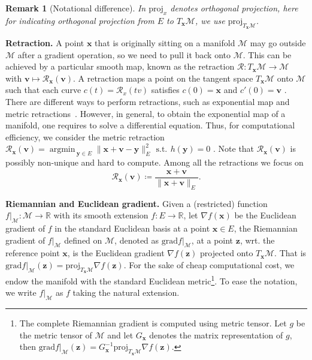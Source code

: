 \documentclass[sn-mathphys-num]{sn-jnl}
\DeclareMathOperator*{\argmin}{\textrm{argmin}\,} %
\def\grad            {\textrm{grad}}     %
\def\proj            {\textrm{proj}}     %
\def\st              {\,\textrm{s.t.}\,} %
\def\IR  {\mathbb{R}} 	    %
\def\v {\bm{v}}
\def\x {\bm{x}}
\def\y {\bm{y}}
\def\z {\bm{z}}
\def\cM { \mathcal{M}}
\def\cR { \mathcal{R}}
\newtheorem{remark}{Remark}
\begin{document}
\begin{remark}[Notational difference]
In \cite[Ch3, Def3.60]{boumal2023introduction} $\proj_x$ denotes orthogonal projection, here for indicating orthogonal projection from $E$ to $T_{\x}\cM$, we use $\proj_{T_{\x}\cM}$.
\\
\end{remark}

\noindent\textbf{Retraction.}
A point $\x$ that is originally sitting on a manifold $\cM$ may go outside $\cM$ after a gradient operation, so we need to pull it back onto $\cM$. 
This can be achieved by a particular smooth map, known as the retraction $\cR: T_{\x}\cM \to \cM$ with $\v\mapsto \cR_{\x}(\v)$.
A retraction maps a point on the tangent space $T_{\x}\cM$ onto $\cM$ such that each curve $c(t) = \cR_x(tv)$ satisfies $c(0) = \x$ and $c'(0) = \v$ \cite[Ch3, Def3.47]{boumal2023introduction}.
There are different ways to perform retractions, such as exponential map and metric retractions~\cite[]{boumal2023introduction}.
However, in general, to obtain the exponential map of a manifold, one requires to solve a differential equation.
Thus, for computational efficiency, we consider the metric retraction $
\cR_{\x}(\v) = \argmin_{\y \in E}\| \x + \v - \y \|_E^2 
~\st~ h(\y) = 0$ \cite[]{boumal2023introduction}.
Note that $\cR_{\x}(\v)$ is possibly non-unique and hard to compute.
Among all the retractions we focus on
\begin{equation}\label{metric_retraction}
\cR_{\x}(\v) \coloneqq 
\dfrac{\x+\v}{\|\x+\v\|_E}.
\tag{Metric retraction}
\end{equation}





\noindent\textbf{Riemannian and Euclidean gradient.}
Given a (restricted) function $f\big|_{\cM} : \cM \to \IR$ with its smooth extension $f : E \to \IR$,
let $\nabla f (\x)$ be the Euclidean gradient of $f$ in the standard Euclidean basis at a point $\x \in E$, the Riemannian gradient of $f\big|_{\cM}$ defined on $\cM$, denoted as $\grad f\big|_{\cM}$, at a point $\z$, wrt. the reference point $\x$, is the Euclidean gradient $\nabla f(\z)$ projected onto $T_{\x}\cM$.
That is $\grad f\big|_{\cM} (\z)  = \proj_{T_{\x}\cM} \nabla f(\z) $.
For the sake of cheap computational cost, we endow the manifold with the standard Euclidean metric\footnote{The complete Riemannian gradient is computed using metric tensor.
Let $g$ be the metric tensor of $\cM$ and let $G_{\x}$ denotes the matrix representation of $g$,
then $\grad f\big|_{\cM} (\z) = G^{-1}_{\x} \proj_{T_{\x}\cM} \nabla f(\z)$.}.
To ease the notation, we write $f\big|_{\cM}$ as $f$ taking the natural extension.
\end{document}
